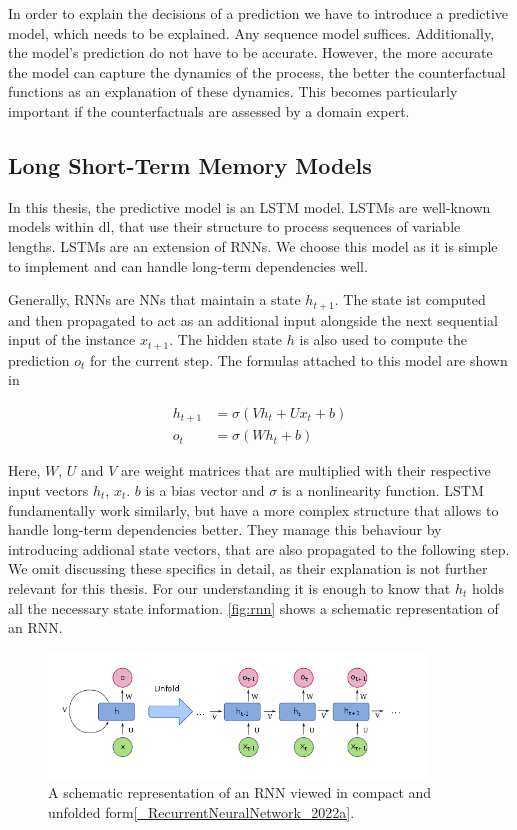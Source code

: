 \documentclass[./../../paper.tex]{subfiles}
\begin{document}
In order to explain the decisions of a prediction we have to introduce a predictive model, which needs to be explained. Any sequence model suffices. Additionally, the model's prediction do not have to be accurate. However, the more accurate the model can capture the dynamics of the process, the better the counterfactual functions as an explanation of these dynamics. This becomes particularly important if the counterfactuals are assessed by a domain expert. 

\subsection{Long Short-Term Memory Models}
In this thesis, the predictive model is an \gls{LSTM} model. LSTMs are well-known models within \gls{dl}, that use their structure to process sequences of variable lengths\autocite{hochreiter}. LSTMs are an extension of \glspl{RNN}. We choose this model as it is simple to implement and can handle long-term dependencies well.

Generally, \glspl{RNN} are \glspl{NN} that maintain a state $h_{t+1}$. The state ist computed and then propagated to act as an additional input alongside the next sequential input of the instance $x_{t+1}$. The hidden state $h$ is also used to compute the prediction $o_{t}$ for the current step. The formulas attached to this model are shown in 

\begin{align}
    \label{eq:rnn}
    h_{t+1} &= \sigma(V h_t + U x_t + b)\\
    o_{t} &= \sigma(W h_t + b)
\end{align}

Here, $W$, $U$ and $V$ are weight matrices that are multiplied with their respective input vectors $h_t$, $x_t$. $b$ is a bias vector and $\sigma$ is a nonlinearity function. LSTM fundamentally work similarly, but have a more complex structure that allows to handle long-term dependencies better. They manage this behaviour by introducing addional state vectors, that are also propagated to the following step. We omit discussing these specifics in detail, as their explanation is not further relevant for this thesis. For our understanding it is enough to know that $h_t$ holds all the necessary state information. \autoref{fig:rnn} shows a schematic representation of an RNN.   

\begin{figure}[htb]
    \label{fig:rnn}
    \centering
    \includegraphics[width=0.9\textwidth]{figures/rnn.png}
    \caption{A schematic representation of an RNN viewed in compact and unfolded form\autoref{_RecurrentNeuralNetwork_2022a}.}
\end{figure}
\end{document}
